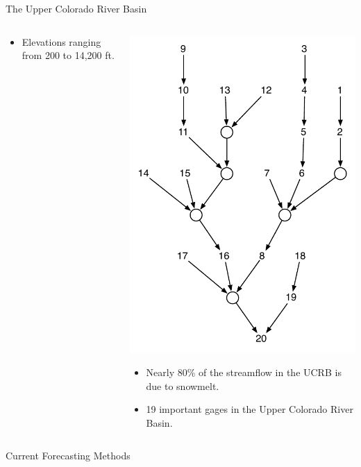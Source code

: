 \documentclass[final,x11names]{beamer}
\begin{document}
\begin{frame}{}
\begin{columns}
\begin{column}{.33\linewidth}
\begin{block}{\large The Upper Colorado River Basin}
\begin{columns}
\begin{column}{.47\textwidth}
\begin{itemize}
			      \item Elevations ranging from 200 to 14,200 ft.
			      \end{itemize}
			  \end{column} 
			  \begin{column}{.52\textwidth} 
				\includegraphics[width=.9\columnwidth]{figs/intervening-to-total-schematic.pdf}
				\begin{itemize}
			      \item Nearly 80\% of the streamflow in the UCRB is due to snowmelt.
			      \item 19 important gages in the Upper Colorado River Basin.
			    \end{itemize}
			  \end{column} 
			  
			\end{columns} 

		\end{block}
		
		\begin{block}{\large Current Forecasting Methods}
			\begin{columns} [T]
			  \begin{column}{.5\textwidth} 
			  

\end{column}
\end{columns}
\end{block}
\end{column}
\end{columns}
\end{frame}
\end{document}
